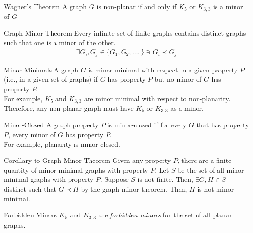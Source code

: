 \documentclass[10pt]{extarticle}
\begin{document}
  \begin{problem}{Wagner's Theorem}
    A graph $G$ is non-planar if and only if $K_5$ or $K_{3,3}$ is a minor of $G$.
  \end{problem}
  \begin{problem}{Graph Minor Theorem}
    Every infinite set of finite graphs contains distinct graphs such that one is a minor of the other.
    \begin{align*}
      \exists G_i,G_j \in \{G_1,G_2,\dots,\} \ni G_i\prec G_j
    \end{align*}
  \end{problem}
  \begin{problem}{Minor Minimals}
    A graph $G$ is minor minimal with respect to a given property $P$ (i.e., in a given set of graphs) if $G$ has property $P$ but no minor of $G$ has property $P$.\\

    For example, $K_5$ and $K_{3,3}$ are minor minimal with respect to non-planarity. Therefore, any non-planar graph must have $K_5$ or $K_{3,3}$ as a minor.
  \end{problem}
  \begin{problem}{Minor-Closed}
    A graph property $P$ is minor-closed if for every $G$ that has property $P$, every minor of $G$ has property $P$.\\

    For example, planarity is minor-closed.
  \end{problem}
  \begin{problem}{Corollary to Graph Minor Theorem}
    Given any property $P$, there are a finite quantity of minor-minimal graphs with property $P$.
    \tcblower
    Let $S$ be the set of all minor-minimal graphs with property $P$. Suppose $S$ is not finite. Then, $\exists G, H\in S$ distinct such that $G\prec H$ by the graph minor theorem. Then, $H$ is not minor-minimal.
  \end{problem}
  \begin{problem}{Forbidden Minors}
    $K_5$ and $K_{3,3}$ are \textit{forbidden minors} for the set of all planar graphs.
  \end{problem}
\end{document}
